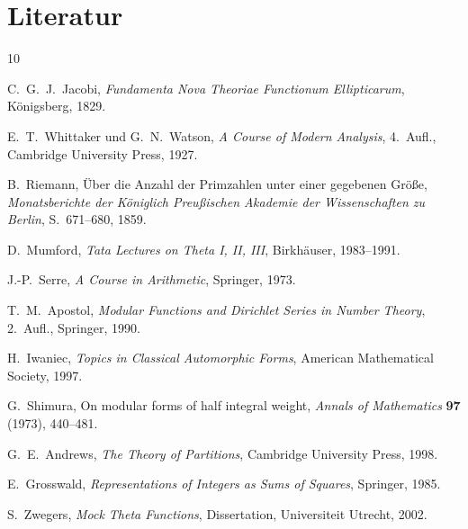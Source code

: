 \documentclass[12pt,a4paper]{amsart}
\theoremstyle{definition}
\begin{document}
\section*{Literatur}

\begin{thebibliography}{10}

C.~G.~J.~Jacobi,
\textit{Fundamenta Nova Theoriae Functionum Ellipticarum},
Königsberg, 1829.

E.~T.~Whittaker und G.~N.~Watson,
\textit{A Course of Modern Analysis}, 4.~Aufl.,
Cambridge University Press, 1927.

B.~Riemann,
Über die Anzahl der Primzahlen unter einer gegebenen Größe,
\textit{Monatsberichte der Königlich Preußischen Akademie der Wissenschaften zu Berlin},
S.~671--680, 1859.

D.~Mumford,
\textit{Tata Lectures on Theta I, II, III},
Birkhäuser, 1983--1991.

J.-P.~Serre,
\textit{A Course in Arithmetic},
Springer, 1973.

T.~M.~Apostol,
\textit{Modular Functions and Dirichlet Series in Number Theory}, 2.~Aufl.,
Springer, 1990.

H.~Iwaniec,
\textit{Topics in Classical Automorphic Forms},
American Mathematical Society, 1997.

G.~Shimura,
On modular forms of half integral weight,
\textit{Annals of Mathematics} \textbf{97} (1973), 440--481.

G.~E.~Andrews,
\textit{The Theory of Partitions},
Cambridge University Press, 1998.

E.~Grosswald,
\textit{Representations of Integers as Sums of Squares},
Springer, 1985.

S.~Zwegers,
\textit{Mock Theta Functions},
Dissertation, Universiteit Utrecht, 2002.

\end{thebibliography}
\end{document}
